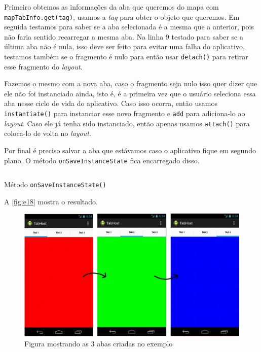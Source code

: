 \documentclass[a4paper,12pt,brazil,oneside]{book}
\begin{document}
\begin{singlespace}
	Primeiro obtemos as informações da aba que queremos do mapa com \texttt{mapTabInfo.get(tag)}, usamos a \emph{tag} para obter o objeto que queremos. Em seguida testamos para saber se a aba selecionada é a mesma que a anterior, pois não faria sentido recarregar a mesma aba. Na linha 9 testado para saber se a última aba não é nula, isso deve ser feito para evitar uma falha do aplicativo, testamos também se o fragmento é nulo para então usar \texttt{detach()} para retirar esse fragmento do \emph{layout}. 
	
	Fazemos o mesmo com a nova aba, caso o fragmento seja nulo isso quer dizer que ele não foi instanciado ainda, isto é, é a primeira vez que o usuário seleciona essa aba nesse ciclo de vida do aplicativo. Caso isso ocorra, então usamos \texttt{instantiate()} para instanciar esse novo fragmento e \texttt{add} para adiciona-lo ao \emph{layout}. Caso ele já tenha sido instanciado, então apenas usamos \texttt{attach()} para coloca-lo de volta no \emph{layout}.
	
	Por final é preciso salvar a aba que estávamos caso o aplicativo fique em segundo plano. O método \texttt{onSaveInstanceState} fica encarregado disso.
	
	\begin{listing}[H]
	\inputminted[linenos=true,fontsize=\small,frame=lines, framesep=2mm, tabsize=2,numbersep=5pt]{java}{src/design/onsavetab.java}
	\caption{Método \texttt{onSaveInstanceState()}}
	\end{listing}
	
	A \autoref{fig:e18} mostra o resultado.
	
	\begin{figure}[H]
	  \centering
	  \includegraphics[width=1\textwidth]{figuras/design/tabs-rgb.jpg}
	  \caption{Figura mostrando as 3 abas criadas no exemplo}
	  \label{fig:e18}
	\end{figure}
	

\end{singlespace}
\end{document}
